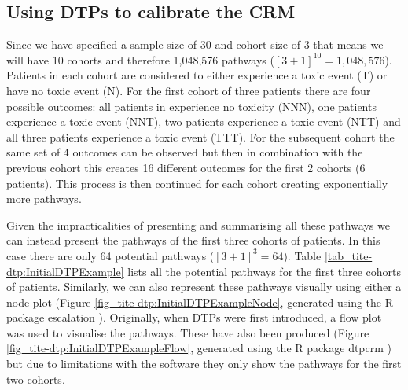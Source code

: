 \subsection{Using DTPs to calibrate the CRM}
\label{tite-dtp:UsingDTPs-Calibration}

Since we have specified a sample size of 30 and cohort size of 3 that means we will have 10 cohorts and therefore 1,048,576 pathways ($[3+1]^{10} = 1,048,576$). Patients in each cohort are considered to either experience a toxic event (T) or have no toxic event (N). For the first cohort of three patients there are four possible outcomes: all patients in experience no toxicity (NNN), one patients experience a toxic event (NNT), two patients experience a toxic event (NTT) and all three patients experience a toxic event (TTT). For the subsequent cohort the same set of 4 outcomes can be observed but then in combination with the previous cohort this creates 16 different outcomes for the first 2 cohorts (6 patients). This process is then continued for each cohort creating exponentially more pathways. 

Given the impracticalities of presenting and summarising all these pathways we can instead present the pathways of the first three cohorts of patients. In this case there are only 64 potential pathways ($[3+1]^{3} = 64$). Table \ref{tab_tite-dtp:InitialDTPExample} lists all the potential pathways for the first three cohorts of patients. Similarly, we can also represent these pathways visually using either a node plot (Figure \ref{fig_tite-dtp:InitialDTPExampleNode}, generated using the R package escalation \cite{brockModularApproachDose2020}). Originally, when DTPs were first introduced, a flow plot was used to visualise the pathways. These have also been produced (Figure \ref{fig_tite-dtp:InitialDTPExampleFlow}, generated using the R package dtpcrm \cite{yapDtpcrmDoseTransition2019}) but due to limitations with the software they only show the pathways for the first two cohorts. 

